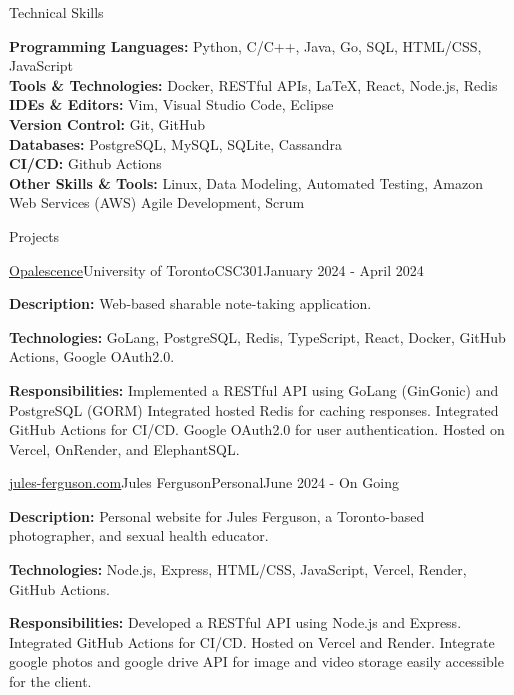 \documentclass[11pt]{resume} %
\begin{document}
\begin{rSection}{Technical Skills}

	\textbf{Programming Languages:} Python, C/C++, Java, Go, SQL, HTML/CSS, JavaScript \\
	\textbf{Tools \& Technologies:} Docker, RESTful APIs, LaTeX, React, Node.js, Redis \\
	\textbf{IDEs \& Editors:} Vim, Visual Studio Code, Eclipse \\
	\textbf{Version Control:} Git, GitHub \\
	\textbf{Databases:} PostgreSQL, MySQL, SQLite, Cassandra \\
	\textbf{CI/CD:} Github Actions \\
	\textbf{Other Skills \& Tools:} Linux, Data Modeling, Automated Testing, Amazon Web Services (AWS) Agile Development, Scrum

\end{rSection}


\begin{rSection}{Projects}

	\begin{rSubsection}{\href{https://github.com/opalescencelabs}{Opalescence}}{University of Toronto}{CSC301}{January 2024 - April 2024}
		\item	\textbf{Description:} Web-based sharable note-taking application.
		\item	\textbf{Technologies:} GoLang, PostgreSQL, Redis, TypeScript, React, Docker, GitHub Actions, Google OAuth2.0.
		\item	\textbf{Responsibilities:} Implemented a RESTful API using GoLang (GinGonic) and PostgreSQL (GORM) Integrated hosted Redis for caching responses. Integrated GitHub Actions for CI/CD. Google OAuth2.0 for user authentication. Hosted on Vercel, OnRender, and ElephantSQL.
	\end{rSubsection}

	\begin{rSubsection}{\href{https://jules-ferguson.com}{jules-ferguson.com}}{Jules Ferguson}{Personal}{June 2024 - On Going}
		\item	\textbf{Description:} Personal website for Jules Ferguson, a Toronto-based photographer, and sexual health educator.
		\item	\textbf{Technologies:} Node.js, Express, HTML/CSS, JavaScript, Vercel, Render, GitHub Actions.
		\item	\textbf{Responsibilities:} Developed a RESTful API using Node.js and Express. Integrated GitHub Actions for CI/CD. Hosted on Vercel and Render. Integrate google photos and google drive API for image and video storage easily accessible for the client.
	\end{rSubsection}

\end{rSection}
\end{document}
